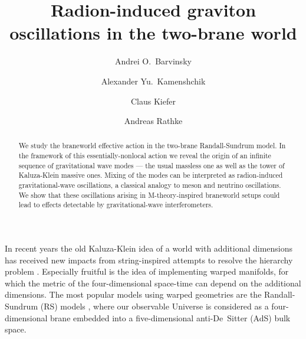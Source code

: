 \documentclass[a4paper,prl,twocolumn,amsmath,amssymb,showpacs]{revtex4}
\begin{document}
 
\title{Radion-induced graviton oscillations in the two-brane world} 
\author{Andrei O.\ Barvinsky}  
\author{Alexander Yu.\ Kamenshchik} 
\author{Claus Kiefer} 
\author{Andreas Rathke} 
\begin{abstract} 
We study the braneworld effective action in the two-brane Randall-Sundrum
model.  In the framework of this essentially-nonlocal action we reveal the
origin of an infinite sequence of gravitational wave modes --- the usual
massless one as well as the tower of Kaluza-Klein massive ones.  Mixing of
the modes can be interpreted as radion-induced gravitational-wave
oscillations, a classical analogy to meson and neutrino oscillations.  We
show that these oscillations arising in M-theory-inspired braneworld setups
could lead to effects detectable by gravitational-wave interferometers.
\end{abstract} 
\maketitle 
 
In recent years the old Kaluza-Klein idea of a world with additional  
dimensions has received new impacts from string-inspired attempts to resolve 
the hierarchy problem \cite{kubyshinrubakov}. Especially fruitful is the idea 
of implementing warped manifolds, for which the metric of the four-dimensional 
space-time can depend on the additional dimensions.  The most popular models 
using warped geometries are the Randall-Sundrum (RS) models \cite{RS1,RS2}, 
where our observable Universe 
 is considered as a four-dimensional brane embedded into a 
five-dimensional anti-De~Sitter (AdS) bulk space. 
 
\end{document}
